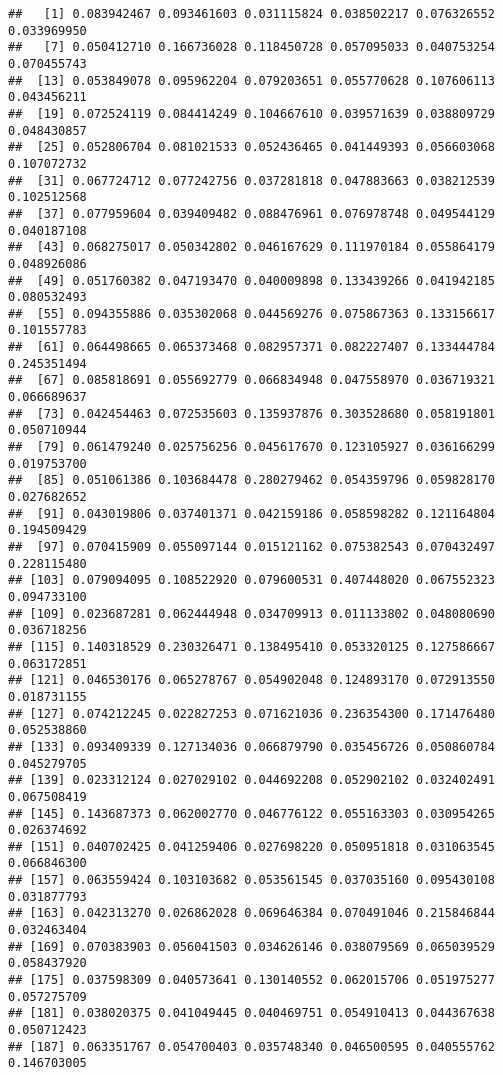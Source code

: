 \documentclass[
]{article}
\begin{document}
\begin{verbatim}
##   [1] 0.083942467 0.093461603 0.031115824 0.038502217 0.076326552 0.033969950
##   [7] 0.050412710 0.166736028 0.118450728 0.057095033 0.040753254 0.070455743
##  [13] 0.053849078 0.095962204 0.079203651 0.055770628 0.107606113 0.043456211
##  [19] 0.072524119 0.084414249 0.104667610 0.039571639 0.038809729 0.048430857
##  [25] 0.052806704 0.081021533 0.052436465 0.041449393 0.056603068 0.107072732
##  [31] 0.067724712 0.077242756 0.037281818 0.047883663 0.038212539 0.102512568
##  [37] 0.077959604 0.039409482 0.088476961 0.076978748 0.049544129 0.040187108
##  [43] 0.068275017 0.050342802 0.046167629 0.111970184 0.055864179 0.048926086
##  [49] 0.051760382 0.047193470 0.040009898 0.133439266 0.041942185 0.080532493
##  [55] 0.094355886 0.035302068 0.044569276 0.075867363 0.133156617 0.101557783
##  [61] 0.064498665 0.065373468 0.082957371 0.082227407 0.133444784 0.245351494
##  [67] 0.085818691 0.055692779 0.066834948 0.047558970 0.036719321 0.066689637
##  [73] 0.042454463 0.072535603 0.135937876 0.303528680 0.058191801 0.050710944
##  [79] 0.061479240 0.025756256 0.045617670 0.123105927 0.036166299 0.019753700
##  [85] 0.051061386 0.103684478 0.280279462 0.054359796 0.059828170 0.027682652
##  [91] 0.043019806 0.037401371 0.042159186 0.058598282 0.121164804 0.194509429
##  [97] 0.070415909 0.055097144 0.015121162 0.075382543 0.070432497 0.228115480
## [103] 0.079094095 0.108522920 0.079600531 0.407448020 0.067552323 0.094733100
## [109] 0.023687281 0.062444948 0.034709913 0.011133802 0.048080690 0.036718256
## [115] 0.140318529 0.230326471 0.138495410 0.053320125 0.127586667 0.063172851
## [121] 0.046530176 0.065278767 0.054902048 0.124893170 0.072913550 0.018731155
## [127] 0.074212245 0.022827253 0.071621036 0.236354300 0.171476480 0.052538860
## [133] 0.093409339 0.127134036 0.066879790 0.035456726 0.050860784 0.045279705
## [139] 0.023312124 0.027029102 0.044692208 0.052902102 0.032402491 0.067508419
## [145] 0.143687373 0.062002770 0.046776122 0.055163303 0.030954265 0.026374692
## [151] 0.040702425 0.041259406 0.027698220 0.050951818 0.031063545 0.066846300
## [157] 0.063559424 0.103103682 0.053561545 0.037035160 0.095430108 0.031877793
## [163] 0.042313270 0.026862028 0.069646384 0.070491046 0.215846844 0.032463404
## [169] 0.070383903 0.056041503 0.034626146 0.038079569 0.065039529 0.058437920
## [175] 0.037598309 0.040573641 0.130140552 0.062015706 0.051975277 0.057275709
## [181] 0.038020375 0.041049445 0.040469751 0.054910413 0.044367638 0.050712423
## [187] 0.063351767 0.054700403 0.035748340 0.046500595 0.040555762 0.146703005

\end{verbatim}
\end{document}
